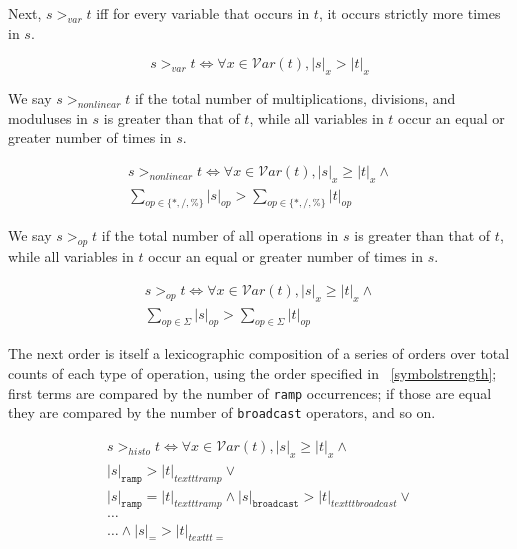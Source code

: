 \documentclass[sigplan,10pt,review,anonymous]{acmart}\settopmatter{printfolios=true,printccs=false,printacmref=false}
\begin{document}
Next, $s >_{var} t$ iff for every variable that occurs in $t$, it occurs strictly more times in $s$.

\begin{equation*}
s >_{var} t \iff \forall x \in \mathcal{V}ar(t), |s|_x > |t|_x
\end{equation*}

We say $s >_{nonlinear} t$ if the total number of multiplications, divisions, and moduluses in $s$ is greater than that of $t$, while all variables in $t$ occur an equal or greater number of times in $s$.

\begin{equation}
\begin{split}
s >_{nonlinear} t \iff \forall x \in \mathcal{V}ar(t), |s|_x \geq |t|_x \wedge \\
\sum_{op \in \{*,/,\%\}} |s|_{op} > \sum_{op \in \{*,/,\%\}} |t|_{op}
\end{split}
\end{equation}

We say $s >_{op} t$ if the total number of all operations in $s$ is greater than that of $t$, while all variables in $t$ occur an equal or greater number of times in $s$.

\begin{equation}
\begin{split}
s >_{op} t \iff \forall x \in \mathcal{V}ar(t), |s|_x \geq |t|_x \wedge \\
\sum_{op \in \Sigma} |s|_{op} > \sum_{op \in \Sigma} |t|_{op}
\end{split}
\end{equation}

The next order is itself a lexicographic composition of a series of orders over total counts of each type of operation, using the order specified in ~\ref{symbolstrength}; first terms are compared by the number of \texttt{ramp} occurrences; if those are equal they are compared by the number of \texttt{broadcast} operators, and so on. 

\begin{equation}
\begin{split}
s >_{histo} t \iff \forall x \in \mathcal{V}ar(t), |s|_x \geq |t|_x \wedge \\
|s|_{\texttt{ramp}} > |t|_{texttt{ramp}} \vee \\
|s|_{\texttt{ramp}} = |t|_{texttt{ramp}} \wedge |s|_{\texttt{broadcast}} > |t|_{texttt{broadcast}} \vee \\
\dots \\
\dots \wedge |s|_{\texttt{=}} > |t|_{texttt{=}} 
\end{split}
\end{equation}
\end{document}
